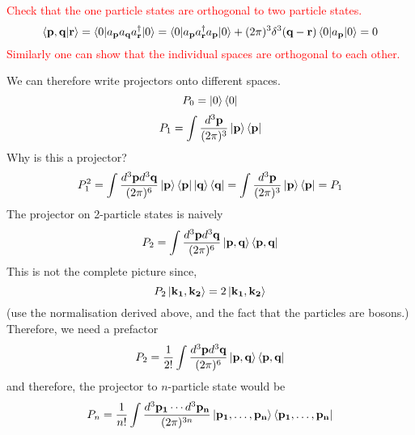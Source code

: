 \documentclass[11pt]{article}
\renewcommand{\a}[1]{a_\mathbf{#1}}
\newcommand{\adag}[1]{a^\dagger_\mathbf{#1}}
\numberwithin{equation}{section}
\begin{document}
    \textcolor{red}{
        Check that the one particle states are orthogonal to two particle states.
        \begin{equation*}
            \braket{\textbf{p}, \textbf{q} | \textbf{r}} = \braket{0| \a{p}\a{q}\adag{r}|0} = \braket{0|\a{p}\adag{r}\a{p}|0} + (2\pi)^3\delta^3(\textbf{q} - \textbf{r})\braket{0|\a{p}|0} = 0
        \end{equation*}
        Similarly one can show that the individual spaces are orthogonal to each other.\\
    }

    We can therefore write projectors onto different spaces. 
    \begin{equation*}
        P_0 = \ket{0}\bra{0}
    \end{equation*}
    \begin{equation*}
        P_1 = \int  \frac{d^3\textbf{p}}{(2\pi)^3} \ket{\textbf{p}}\bra{\textbf{p}}
    \end{equation*}
    Why is this a projector? \\
    \begin{equation*}
        P_1^2 = \int  \frac{d^3\textbf{p}d^3\textbf{q}}{(2\pi)^6} \ket{\textbf{p}}\bra{\textbf{p}} \ket{\textbf{q}}\bra{\textbf{q}} = \int  \frac{d^3\textbf{p}}{(2\pi)^3} \ket{\textbf{p}}\bra{\textbf{p}} = P_1
    \end{equation*}
    The projector on 2-particle states is naively
    \begin{equation*}
        P_2 = \int  \frac{d^3\textbf{p}d^3\textbf{q}}{(2\pi)^6} \ket{\textbf{p}, \textbf{q}}\bra{\textbf{p}, \textbf{q}} 
    \end{equation*}
    This is not the complete picture since, 
    \begin{equation*}
        P_2 \ket{\mathbf{k_1}, \mathbf{k_2}} = 2\ket{\mathbf{k_1}, \mathbf{k_2}}
    \end{equation*}
    (use the normalisation derived above, and the fact that the particles are bosons.)\\
    Therefore, we need a prefactor 
    \begin{equation*}
        P_2 = \frac{1}{2!}\int  \frac{d^3\textbf{p}d^3\textbf{q}}{(2\pi)^6} \ket{\textbf{p}, \textbf{q}}\bra{\textbf{p}, \textbf{q}} 
    \end{equation*}
    and therefore, the projector to \(n\)-particle state would be 
    \begin{equation*}
        P_n = \frac{1}{n!}\int  \frac{d^3\mathbf{p_1}\cdots d^3\mathbf{p_n}}{(2\pi)^{3n}} \ket{\mathbf{p_1},\ldots, \mathbf{p_n}}\bra{\mathbf{p_1},\ldots, \mathbf{p_n}} 
    \end{equation*}
\end{document}
